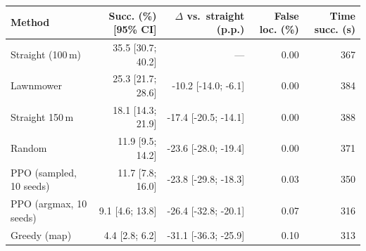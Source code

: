 \begin{tabular}{@{}lrrrr@{}}
\toprule
Method & Succ. (\%) [95\% CI] & $\Delta$ vs.\ straight (p.p.) & False loc. (\%) & Time succ. (s) \\
\midrule
Straight (100\,m) & 35.5 [30.7; 40.2] & --- & 0.00 & 367 \\
Lawnmower & 25.3 [21.7; 28.6] & -10.2 [-14.0; -6.1] & 0.00 & 384 \\
Straight 150\,m & 18.1 [14.3; 21.9] & -17.4 [-20.5; -14.1] & 0.00 & 388 \\
Random & 11.9 [9.5; 14.2] & -23.6 [-28.0; -19.4] & 0.00 & 371 \\
PPO (sampled, 10 seeds) & 11.7 [7.8; 16.0] & -23.8 [-29.8; -18.3] & 0.03 & 350 \\
PPO (argmax, 10 seeds) & 9.1 [4.6; 13.8] & -26.4 [-32.8; -20.1] & 0.07 & 316 \\
Greedy (map) & 4.4 [2.8; 6.2] & -31.1 [-36.3; -25.9] & 0.10 & 313 \\
\bottomrule
\end{tabular}
